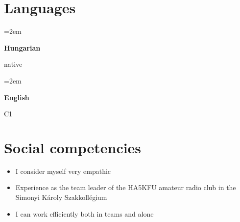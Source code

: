 \documentclass[12pt,oneside]{article} %
\newlength{\spacebox}
\newcommand{\lan}[2]{
	\noindent\hangindent=2em\hangafter=0
	\parbox{2\spacebox}{%
		\textbf{#1}} %
	 #2 \par}    %
\begin{document}
\section*{Languages}
\lan{Hungarian}{native}
\lan{English}{C1}

\section*{Social competencies}
\begin{itemize} \setlength\itemsep{0.5ex}
	\item I consider myself very empathic
	\item Experience as the team leader of the HA5KFU amateur radio club in the Simonyi Károly Szakkollégium
	\item I can work efficiently both in teams and alone
\end{itemize}
\end{document}
